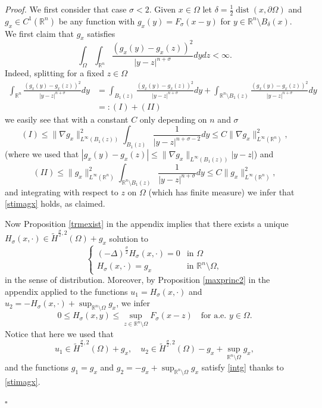 \documentclass[11pt, a4paper]{article}
\newcommand{\R}{\mathbb{R}}
\newcommand{\de}{\partial}
\newenvironment{proof}{\noindent\emph{Proof.}}{\phantom{ } \hfill$\square$\medskip}
\DeclareMathOperator*{\dist}{dist}
\begin{document}
\begin{proof} We first consider that case $\sigma<2$. Given $x\in \Omega$ let $\delta=\frac{1}{2}\dist(x,\de\Omega)$ and $g_x\in C^1(\R^{n})$ be any function with $g_x(y)=F_\sigma(x-y)$ for $y\in\R^{n}\setminus B_\delta(x)$. We first claim that $g_x$ satisfies
\begin{equation}\label{stimagx}
\int_\Omega\int_{\R^n}\frac{(g_x(y)-g_x(z))^2}{|y-z|^{n+\sigma}}dydz<\infty.
\end{equation}
Indeed, splitting for a fixed $z\in \Omega$
\[
\begin{split}
\int_{\R^n}\frac{(g_x(y)-g_x(z))^2}{|y-z|^{n+\sigma}}dy&= \int_{B_1(z)}\frac{(g_x(y)-g_x(z))^2}{|y-z|^{n+\sigma}}dy +\int_{\R^n\setminus B_1(z)}\frac{(g_x(y)-g_x(z))^2}{|y-z|^{n+\sigma}}dy\\
&=:(I)+(II)
\end{split}
\]
we easily see that with a constant $C$ only depending on $n$ and $\sigma$
$$(I)\le \|\nabla g_x\|_{L^\infty(B_1(z))}^2 \int_{B_1(z)}\frac{1}{|y-z|^{n+\sigma-2}}dy\le C\|\nabla g_x\|_{L^\infty(\R^n)}^2,$$
(where we used that $|g_x(y)-g_x(z)|\le \|\nabla g_x\|_{L^\infty(B_1(z))}|y-z|$) and
$$(II)\le \|g_x\|_{L^\infty(\R^n)}^2\int_{\R^n\setminus B_1(z)}\frac{1}{|y-z|^{n+\sigma}}dy \le C \|g_x\|_{L^\infty(\R^n)}^2,$$
and integrating with respect to $z$ on $\Omega$ (which has finite measure) we infer that \eqref{stimagx} holds, as claimed.

\medskip

Now Proposition \ref{trmexist} in the appendix implies that there exists a unique $H_\sigma(x,\cdot)\in \tilde H^{\frac \sigma 2,2}(\Omega)+g_x$ solution to 
\begin{equation}\label{H}
\left\{
\begin{array}{ll}
(-\Delta)^\frac{\sigma}{2} H_\sigma(x,\cdot)=0 &\text{in } \Omega\\
H_\sigma(x,\cdot )=g_x &\text{in } \R^{n}\setminus \Omega,
\end{array}
\right.
\end{equation}
in the sense of distribution. Moreover, by Proposition \ref{maxprinc2} in the appendix applied to the functions $u_1= H_\sigma(x,\cdot)$ and $u_2=-H_\sigma(x,\cdot)+\sup_{\R^n\setminus\Omega} g_x$, we infer
\begin{equation}\label{stimaHmax}
0\le H_\sigma(x,y)\le  \sup_{z\in\R^n\setminus \Omega} F_\sigma(x-z)\quad \text{for a.e. }y\in \Omega.
\end{equation} 
Notice that here we used that
$$u_1\in \tilde H^{\frac \sigma2,2}(\Omega)+g_x,\quad u_2\in \tilde H^{\frac \sigma2,2}(\Omega)-g_x+\sup_{\R^n\setminus\Omega} g_x,$$
and the functions $g_1=g_x$ and $g_2=-g_x+\sup_{\R^n\setminus\Omega} g_x$ satisfy \eqref{intg} thanks to \eqref{stimagx}.


\end{proof}
\end{document}
